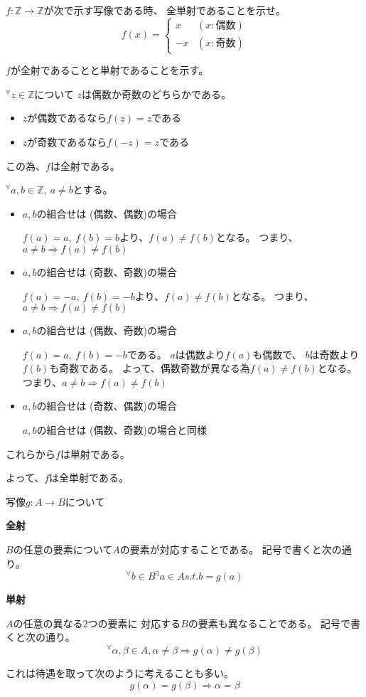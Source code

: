 \documentclass[12pt,b5paper]{ltjsarticle}
\begin{document}
\hrulefill

$f:\mathbb{Z}\to\mathbb{Z}$が次で示す写像である時、
全単射であることを示せ。
\begin{equation}
 f(x)=
  \begin{cases}
   x & (x:\text{偶数})\\
   -x & (x:\text{奇数})
  \end{cases}
\end{equation}

\dotfill

$f$が全射であることと単射であることを示す。

${}^\forall z\in\mathbb{Z}$について
$z$は偶数か奇数のどちらかである。
\begin{itemize}
 \item
      $z$が偶数であるなら$f(z)=z$である
 \item
      $z$が奇数であるなら$f(-z)=z$である
\end{itemize}
この為、$f$は全射である。

${}^{\forall}a,b\in\mathbb{Z},\ a\ne b$とする。
\begin{itemize}
 \item
      $a,b$の組合せは (偶数、偶数)の場合

      $f(a)=a, \ f(b)=b$より、$f(a)\ne f(b)$となる。
      つまり、$a\ne b \Rightarrow f(a)\ne f(b)$
 \item
      $a,b$の組合せは (奇数、奇数)の場合

      $f(a)=-a, \ f(b)=-b$より、$f(a)\ne f(b)$となる。
      つまり、$a\ne b \Rightarrow f(a)\ne f(b)$
 \item
      $a,b$の組合せは (偶数、奇数)の場合

      $f(a)=a, \ f(b)=-b$である。
      $a$は偶数より$f(a)$も偶数で、
      $b$は奇数より$f(b)$も奇数である。
      よって、偶数奇数が異なる為$f(a)\ne f(b)$となる。
      つまり、$a\ne b \Rightarrow f(a)\ne f(b)$
 \item
      $a,b$の組合せは (奇数、偶数)の場合

      $a,b$の組合せは (偶数、奇数)の場合と同様
\end{itemize}
これらから$f$は単射である。

よって、$f$は全単射である。

\hrulefill

写像$g:A\to B$について

\textbf{全射}

$B$の任意の要素について$A$の要素が対応することである。
記号で書くと次の通り。
\begin{equation}
 {}^{\forall}b\in B %
  {}^{\exists}a\in A s.t. b=g(a)
\end{equation}


\textbf{単射}

$A$の任意の異なる2つの要素に
対応する$B$の要素も異なることである。
記号で書くと次の通り。
\begin{equation}
 {}^{\forall}\alpha, \beta \in A, \alpha \ne \beta
  \Rightarrow g(\alpha)\ne g(\beta)
\end{equation}

これは待遇を取って次のように考えることも多い。
\begin{equation}
 g(\alpha)= g(\beta)
  \Rightarrow \alpha = \beta
\end{equation}
\end{document}
